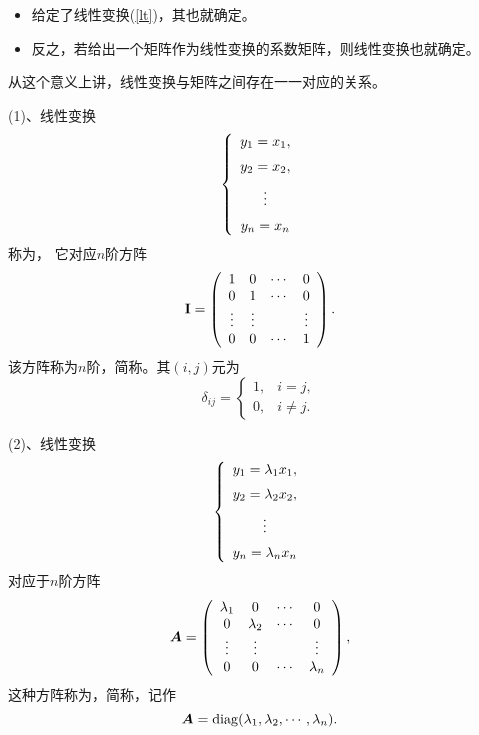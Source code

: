 \begin{frame}
\begin{itemize}
\item  给定了线性变换(\ref{lt})，其也就确定。 \\[0.1in]
\item   反之，若给出一个矩阵作为线性变换的系数矩阵，则线性变换也就确定。 \\[0.1in]
\end{itemize}      
从这个意义上讲，线性变换与矩阵之间存在一一对应的关系。
\end{frame}

\begin{frame}
(1)、线性变换
$$
\left\{
  \begin{array}{c}
    y_1 = x_1, \\[0.2cm]
    y_2 = x_2, \\[0.2cm]
    \vdots \\[0.2cm]
    y_n = x_n
  \end{array}
\right.
$$
称为， 它对应$n$阶方阵
$$
\mathbf{I} = \left(
  \begin{array}{cccc}
    1    & 0    & \cdots  & 0 \\
    0    & 1    & \cdots  & 0 \\
    \vdots  & \vdots  &      & \vdots \\
    0    & 0    & \cdots  & 1
  \end{array}
\right). 
$$ 
该方阵称为$n$阶，简称。其$(i,j)$元为
$$
\delta_{ij} = \left \{
  \begin{array}{ll}
    1, &i=j, \\
    0, &i\ne j.
  \end{array}
\right.  
$$
\end{frame}

\begin{frame}
(2)、线性变换
$$
\left\{
  \begin{array}{c}
    y_1 = \lambda_1 x_1, \\[0.2cm]
    y_2 = \lambda_2 x_2, \\[0.2cm]
    \vdots \\[0.2cm]
    y_n = \lambda_n x_n
  \end{array}
\right.
$$  
对应于$n$阶方阵
$$
\boldsymbol{A} = \left(
  \begin{array}{cccc}
    \lambda_1& 0    & \cdots  & 0 \\
    0    & \lambda_2    & \cdots  & 0 \\
    \vdots  & \vdots  &      & \vdots \\
    0    & 0    & \cdots  & \lambda_n
  \end{array}
\right),
$$
这种方阵称为，简称，记作
$$
\boldsymbol{A} = \mathrm{diag}(\lambda_1,\lambda_2,\cdots,\lambda_n).
$$
\end{frame}

